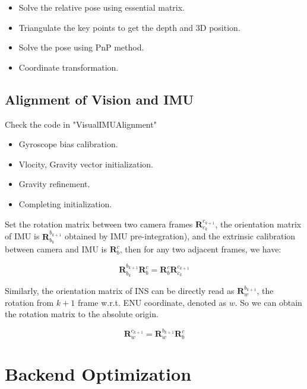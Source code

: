 \documentclass[12pt]{report}   %
\begin{document}
\begin{itemize}
	\item Solve the relative pose using essential matrix.
	\item Triangulate the key points to get the depth and 3D position.
	\item Solve the pose using PnP method.
	\item Coordinate transformation.
	
\end{itemize}


\section{Alignment of Vision and IMU}

Check the code in "VisualIMUAlignment"

\begin{itemize}
	\item Gyroscope bias calibration.
	\item Vlocity, Gravity vector initialization.
	\item Gravity refinement.
	\item Completing initialization.
	
\end{itemize}

Set the rotation matrix between two camera frames $\bm{R}_{c_k}^{c_{k+1}}$, the orientation matrix of IMU is $\bm{R}_{b_k}^{b_{k+1}}$ obtained by IMU pre-integration), and the extrinsic calibration between camera and IMU is $\bm{R}_b^c$, then for any two adjacent frames, we have:

\begin{equation}
	\bm{R}_{b_k}^{b_{k+1}}\bm{R}_b^c = \bm{R}_b^c\bm{R}_{c_k}^{c_{k+1}}
\end{equation}

Similarly, the orientation matrix of INS can be directly read as $\bm{R}_{w}^{b_{k+1}}$, the rotation from $k+1$ frame w.r.t. ENU coordinate, denoted as $w$. So we can obtain the rotation matrix to the absolute origin.

\begin{equation}
\bm{R}_{w}^{c_{k+1}} = \bm{R}_{w}^{b_{k+1}}\bm{R}_b^c
\end{equation}





\chapter{Backend Optimization}
\end{document}
